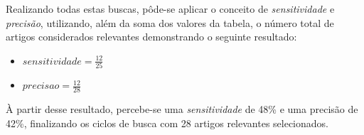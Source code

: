 Realizando todas estas buscas, pôde-se aplicar o conceito de \textit{sensitividade} e \textit{precisão}, utilizando, além da soma dos valores da tabela, o número total de artigos considerados relevantes  demonstrando o seguinte resultado:

\begin{itemize}

    \item $sensitividade = \frac{12}{25}$ 
	\item $precisao = \frac{12}{28}$

\end{itemize}

À partir desse resultado, percebe-se uma \textit{sensitividade} de 48\% e uma precisão de 42\%, finalizando os ciclos de busca com 28 artigos relevantes selecionados.  

